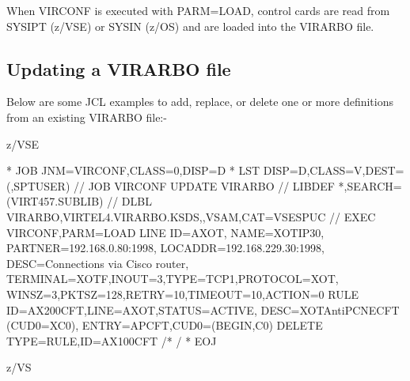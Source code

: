 \documentclass[letterpaper,10pt,english]{sphinxmanual}
\begin{document}

When VIRCONF is executed with PARM=LOAD, control cards are read from SYSIPT (z/VSE) or SYSIN (z/OS) and are loaded into the VIRARBO file.


\subsection{Updating a VIRARBO file}
\label{\detokenize{Installation_Guide:updating-a-virarbo-file}}
Below are some JCL examples to add, replace, or delete one or more definitions from an existing VIRARBO file:-

z/VSE

\begin{sphinxVerbatim}[commandchars=\\\{\}]
* \PYGZdl{}\PYGZdl{} JOB JNM=VIRCONF,CLASS=0,DISP=D
* \PYGZdl{}\PYGZdl{} LST DISP=D,CLASS=V,DEST=(,SPTUSER)
// JOB VIRCONF UPDATE VIRARBO
// LIBDEF *,SEARCH=(VIRT457.SUBLIB)
// DLBL VIRARBO,\PYGZsq{}VIRTEL4.VIRARBO.KSDS\PYGZsq{},,VSAM,CAT=VSESPUC
// EXEC VIRCONF,PARM=\PYGZsq{}LOAD\PYGZsq{}
        LINE  ID=A\PYGZhy{}XOT,
              NAME=XOT\PYGZhy{}IP30,
              PARTNER=192.168.0.80:1998,
              LOCADDR=192.168.229.30:1998,
              DESC=\PYGZsq{}Connections via Cisco router\PYGZsq{},
              TERMINAL=XOTF,INOUT=3,TYPE=TCP1,PROTOCOL=XOT,
              WINSZ=3,PKTSZ=128,RETRY=10,TIMEOUT=10,ACTION=0
        RULE ID=AX200CFT,LINE=A\PYGZhy{}XOT,STATUS=ACTIVE,
              DESC=\PYGZdq{}XOT\PYGZhy{}\PYGZgt{}AntiPCNE\PYGZhy{}\PYGZgt{}CFT (CUD0=X\PYGZsq{}C0\PYGZsq{})\PYGZdq{},
              ENTRY=APCFT,CUD0=(BEGIN,C0)
        DELETE TYPE=RULE,ID=AX100CFT
/*
/\PYGZam{}
* \PYGZdl{}\PYGZdl{} EOJ
\end{sphinxVerbatim}


z/VS
\end{document}
